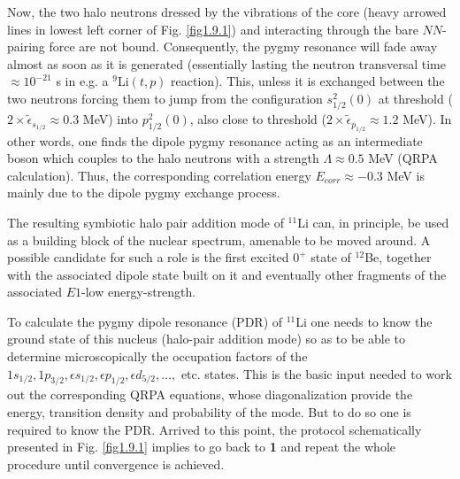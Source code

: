 Now, the two halo neutrons dressed by the vibrations of the core (heavy arrowed lines in lowest left corner of Fig. \ref{fig1.9.1}) and interacting through the bare $NN$-pairing force are not bound. Consequently, the pygmy resonance will fade away almost as soon as it is generated (essentially lasting the neutron transversal time $\approx 10^{-21}$ s in e.g. a $^9$Li$(t,p)$ reaction). This, unless it is exchanged between the two neutrons forcing them to jump from the configuration $s^{2}_{1/2}(0)$ at threshold ($2\times\tilde\epsilon_{s_{1/2}}\approx 0.3$ MeV) into  $p^2_{1/2}(0)$, also close to threshold     ($2\times\tilde\epsilon_{p_{1/2}}\approx 1.2$ MeV). In other words, one finds the dipole pygmy resonance acting as an intermediate boson which  couples to the halo neutrons with a  strength $\Lambda\approx 0.5$ MeV (QRPA calculation). Thus, the corresponding correlation energy $E_{corr}\approx-0.3$ MeV is mainly due to the dipole pygmy exchange process.


 The resulting symbiotic halo pair addition mode of $^{11}$Li can, in principle, be used as a building block of the nuclear spectrum, amenable to  be moved around. A possible candidate for such a role is the first excited $0^+$ state of $^{12}$Be, together with the associated dipole state built on it and eventually other fragments of the associated $E1$-low energy-strength.


 To calculate the pygmy dipole  resonance (PDR) of $^{11}$Li one needs to know the ground state of this nucleus (halo-pair addition mode) so as to be able to determine microscopically the occupation factors of the $1s_{1/2},1p_{3/2},\epsilon s_{1/2},\epsilon p_{1/2},\epsilon d_{5/2},\dots,$ etc. states.  This is the basic input needed to work out the corresponding QRPA equations, whose diagonalization provide the energy, transition density and probability of the mode. But to do so one is required to know the PDR. Arrived to this point, the protocol schematically presented in Fig. \ref{fig1.9.1}  implies to  go back to \textbf{1} and repeat the whole procedure until   convergence is achieved. 

